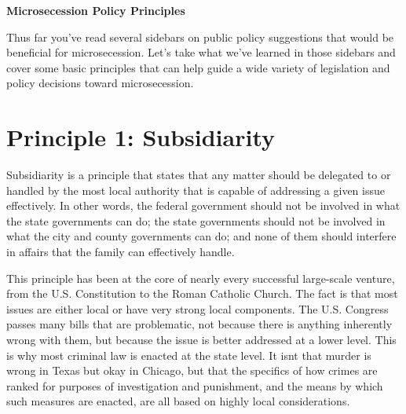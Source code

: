 \documentclass[letterpaper]{article}
\title{}
\begin{document}
\clearpage\setcounter{page}{1}\pagestyle{Standard}
{\centering{}\bfseries\color{black}
Microsecession Policy Principles
\par}

{\color{black}
\textcolor[rgb]{0.32941177,0.5529412,0.83137256}{Thus far you’ve read
several sidebars} on public policy suggestions that would be beneficial
for microsecession.
\textcolor[rgb]{0.32941177,0.5529412,0.83137256}{Let’s take what we’ve
learned in those sidebars and cover some }basic principles that can
help guide a wide variety of legislation and policy decisions toward
microsecession.}

\section{Principle 1: Subsidiarity}
{\color{black}
Subsidiarity is a principle that states that any matter should be
delegated to or handled by the most local authority that is capable of
addressing a given issue effectively. In other words, the federal
government should not be involved in what the state governments can do;
the state governments should not be involved in what the city and
county governments can do;
and\textcolor[rgb]{0.32941177,0.5529412,0.83137256}{ none of them
}should interfere in affairs that the family can effectively handle.}

{\color{black}
This principle has been at the core of nearly every successful
large-scale venture, from the U.S. Constitution to the Roman Catholic
Church. The fact is that most issues are either local or have very
strong local components. The U.S. Congress
\textcolor[rgb]{0.32941177,0.5529412,0.83137256}{passes many bills
}that are problematic, not because there is anything inherently wrong
with them, but because the issue is better addressed at a lower level.
This is why most criminal law is enacted at the state level. It
isn{\textquotesingle}t
\textcolor[rgb]{0.32941177,0.5529412,0.83137256}{that} murder is wrong
in Texas but okay in Chicago, but that the specifics of how crimes are
ranked for purposes of investigation and punishment, and the means by
which such measures are enacted, are all based on highly local
considerations.}
\end{document}
